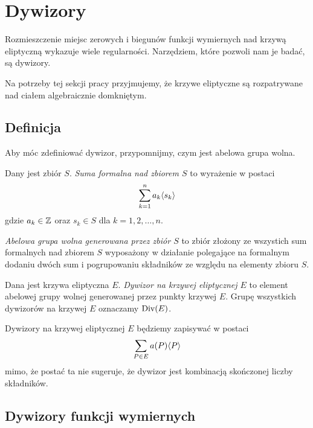 \section{Dywizory}

Rozmieszczenie miejsc zerowych i biegunów
funkcji wymiernych nad krzywą eliptyczną
wykazuje wiele regularności.
Narzędziem, które pozwoli nam je badać, są dywizory.

Na potrzeby tej sekcji pracy przyjmujemy,
że krzywe eliptyczne są rozpatrywane nad ciałem algebraicznie domkniętym.

\subsection*{Definicja}

Aby móc zdefiniować dywizor,
przypomnijmy, czym jest abelowa grupa wolna.

\begin{definition}

Dany jest zbiór $S$.
\emph{Suma formalna nad zbiorem $S$} to wyrażenie w postaci
\begin{equation*}
\sum_{k=1}^n a_k\langle s_k\rangle
\end{equation*}
gdzie $a_k \in \mathbb{Z}$ oraz $s_k \in S$ dla $k = 1, 2, \ldots, n$.

\emph{Abelowa grupa wolna generowana przez zbiór $S$}
to zbiór złożony ze wszystich sum formalnych nad zbiorem $S$
wyposażony w działanie polegające na formalnym dodaniu dwóch sum
i pogrupowaniu składników ze względu na elementy zbioru $S$.
\end{definition}

\begin{definition}
Dana jest krzywa eliptyczna $E$.
\emph{Dywizor na krzywej eliptycznej $E$}
to element abelowej grupy wolnej generowanej przez punkty krzywej $E$.
Grupę wszystkich dywizorów na krzywej $E$ oznaczamy $\operatorname{Div}(E)$.
\end{definition}

\begin{remark}
Dywizory na krzywej eliptycznej $E$ będziemy zapisywać w postaci
\begin{equation*}
\sum_{P \in E} a(P)\langle P\rangle
\end{equation*}
mimo, że postać ta nie sugeruje,
że dywizor jest kombinacją skończonej liczby składników.
\end{remark}

\subsection*{Dywizory funkcji wymiernych}


